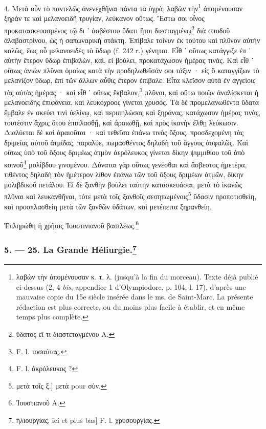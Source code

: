 \documentclass[a4paper, 11pt, oneside, polutonikogreek, french]{article}
\begin{document}
4. Μετὰ οὖν τὸ παντελῶς ἀνενεχθῆναι πάντα τὰ ὑγρὰ, λαβὼν τὴν\footnote{λαβὼν τὴν ἀπομένουσαν κ. τ. λ. (jusqu'à la fin du morceau). Texte déjà publié ci-dessus (2, 4 \emph{bis}, appendice 1 d'Olympiodore, p. 104, l. 17), d'après une mauvaise copie du 15e siècle insérée dans le ms. de Saint-Marc. La présente rédaction est plus correcte, ou du moins plus facile à établir, et en même temps plus complète.} ἀπομένουσαν ξηράν τε καὶ μελανοειδῆ τρυγίαν, λεύκανον οὕτως. Ἔστω σοι οἶνος προκατασκευασμένος τῷ δι ᾽ ἀσβέστου ὕδατι ἤτοι διεσταγμένῳ\footnote{ὕδατος εἴ τι διαστεταγμένου A.} διὰ σποδοῦ ἀλαβαστρίνου, ὡς ἡ σαπωναρικὴ στάκτη. Ἐπίβαλε τοίνυν ἐκ τούτου καὶ πλῦνον αὐτὴν καλῶς, ἕως οὗ μελανοειδὲς τὸ ὕδωρ (f. 242 r.) γένηται. Εἶθ ᾽ οὕτως κατάγγιζε ἐπ ᾽ αὐτὴν ἕτερον ὕδωρ ἐπιβαλὼν, καὶ, εἰ βούλει, προκατάχωσον ἡμέρας τινάς. Καὶ εἶθ ᾽ οὕτως ἀνιὼν πλῦναι ὁμοίως κατὰ τὴν προδηλωθεῖσάν σοι τάξιν · εἰς ὃ καταγγίζων τὸ μελανίζον ὕδωρ, ἐπὶ τῶν ἄλλων αὖθις ἕτερον ἐπίβαλε. Εἶτα κλεῖσον αὐτὰ ἐν ἀγγείοις τὰς αὐτὰς ἡμέρας · καὶ εἶθ ᾽ οὕτως ἔκβαλον,\footnote{F. l. τοσαύτας.} πλῦναι, καὶ οὕτω ποιῶν ἀναλίσκεται ἡ μελανοειδὴς ἐπιφάνεια, καὶ λευκόχροος γίνεται χρυσός. Τὰ δὲ προμελανωθέντα ὕδατα ἔμβαλε ἐν σκεύει τινὶ ὑελίνῳ, καὶ περιπηλώσας καὶ ξηράνας, κατάχωσον ἡμέρας τινὰς, τουτέστιν ἄχρις ὅτου ἐπιπλασθῇ, καὶ ἀραιωθῇ, καὶ πρὸς ἱκανὴν ἔλθῃ λεύκωσιν. Διαλύεται δὲ καὶ ἀραιοῦται · καὶ τεθεῖσα ἐπάνω τινὸς ὄξους, προσδεχομένη τὰς δριμείας αὐτοῦ ἀτμίδας, παραλύε, πωμασθέντος δηλαδὴ τοῦ ἄγγους ἀσφαλῶς. Καὶ οὕτως ὑπὸ τοῦ ὄξους δριμέως ἀτμὸν ἀερόλευκος γίνεται δίκην ψιμμιθίου τοῦ ἀπὸ κοινοῦ\footnote{F. l. ἀκρόλευκος ?} μολίβδου γινομένου. Δύναται γὰρ οὕτως γενέσθαι καὶ ἄσβεστος ἡμετέρα, τιθέντος δηλαδὴ τὸν ἡμέτερον λίθον ἐπάνω τῶν τοῦ ὄξους δριμέων ἀτμῶν, δίκην μολιβδικοῦ πετάλου. Εἰ δὲ ξανθὴν βούλει ταύτην κατασκευάσαι, μετὰ τὸ ἱκανῶς πλῦναι καὶ λευκανθῆναι, τότε μετὰ τοῖς ξανθοῖς σεσηπωμένοις\footnote{μετὰ τοῖς ξ.] μετὰ pour σὺν.} ὕδασιν προποτισθείη, καὶ προσπλασθείη μετὰ τῶν ξανθῶν ὑδάτων, καὶ μετέπειτα ξηρανθείη.

Ἑπληρώθη ἡ χρῆσις Ἰουστινιανοῦ βασιλέως.\footnote{Ἰουστιανοῦ A.}

\bigskip
\centerline{\EightStarTaper}
\centerline{\EightStarTaper\EightStarTaper}
\bigskip

\subsubsection[5. --- 25. La Grande Héliurgie.]{5. --- 25. La Grande Héliurgie.\footnote{ἡλιουργίας, ici et plus bas] F. l. χρυσουργίας.}}
\end{document}
